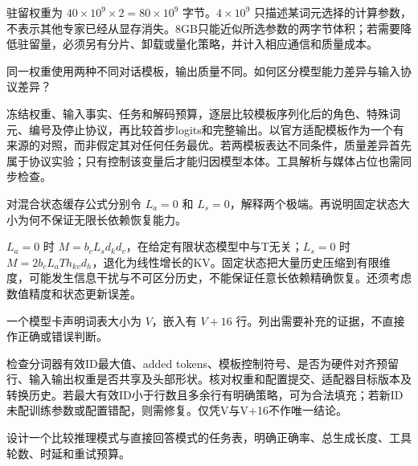 \begin{exercises}
\begin{exercise}
\begin{solution}
驻留权重为 $40\times10^9\times2=80\times10^9$ 字节。$4\times10^9$ 只描述某词元选择的计算参数，不表示其他专家已经从显存消失。8GB只能近似所选参数的两字节体积；若需要降低驻留量，必须另有分片、卸载或量化策略，并计入相应通信和质量成本。
\end{solution}
\end{exercise}

\begin{exercise} 同一权重使用两种不同对话模板，输出质量不同。如何区分模型能力差异与输入协议差异？

\begin{solution}
冻结权重、输入事实、任务和解码预算，逐层比较模板序列化后的角色、特殊词元、编号及停止协议，再比较首步logits和完整输出。以官方适配模板作为一个有来源的对照，而非假定其对任何任务最优。若两模板表达不同条件，质量差异首先属于协议实验；只有控制该变量后才能归因模型本体。工具解析与媒体占位也需同步检查。
\end{solution}
\end{exercise}

\begin{exercise} 对混合状态缓存公式分别令 $L_a=0$ 和 $L_s=0$，解释两个极端。再说明固定状态大小为何不保证无限长依赖恢复能力。

\begin{solution}
$L_a=0$ 时 $M=b_cL_sd_kd_v$，在给定有限状态模型中与T无关；$L_s=0$ 时 $M=2b_cL_aTh_{kv}d_h$，退化为线性增长的KV。固定状态把大量历史压缩到有限维度，可能发生信息干扰与不可区分历史，不能保证任意长依赖精确恢复。还须考虑数值精度和状态更新误差。
\end{solution}
\end{exercise}

\begin{exercise} 一个模型卡声明词表大小为 $V$，嵌入有 $V+16$ 行。列出需要补充的证据，不直接作正确或错误判断。

\begin{solution}
检查分词器有效ID最大值、added tokens、模板控制符号、是否为硬件对齐预留行、输入输出权重是否共享及头部形状。核对权重和配置提交、适配器目标版本及转换历史。若最大有效ID小于行数且多余行有明确策略，可为合法填充；若新ID未配训练参数或配置错配，则需修复。仅凭V与V+16不作唯一结论。
\end{solution}
\end{exercise}

\begin{exercise} 设计一个比较推理模式与直接回答模式的任务表，明确正确率、总生成长度、工具轮数、时延和重试预算。


\end{exercise}
\end{exercises}
